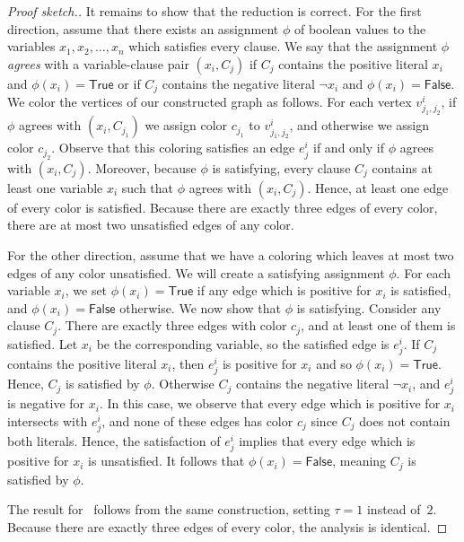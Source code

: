 \begin{proof}[Proof sketch.]
    It remains to show that the reduction is correct.
    For the first direction, assume that there exists an assignment $\phi$ of boolean values to the variables $x_1, x_2, \ldots, x_n$ which satisfies every clause. We say that the assignment $\phi$ \emph{agrees} with a variable-clause pair $(x_i, C_j)$ if $C_j$ contains the positive literal $x_i$ and $\phi(x_i) = \textsf{True}$ or if $C_j$ contains the negative literal $\neg x_i$ and $\phi(x_i) = \textsf{False}$.
    We color the vertices of our constructed graph as follows.
    For each vertex $v_{j_1, j_2}^i$, if $\phi$ agrees with $(x_i, C_{j_1})$ we assign color $c_{j_1}$ to $v_{j_1, j_2}^i$, and otherwise we assign color $c_{j_2}$.
    Observe that this coloring satisfies an edge $e_j^i$ if and only if $\phi$ agrees with $(x_i, C_j)$.
    Moreover, because $\phi$ is satisfying,
    every clause $C_j$ contains at least one variable $x_i$ such that $\phi$ agrees with $(x_i, C_j)$.
    Hence, at least one edge of every color is satisfied. Because there are exactly three edges of every color, there are at most two unsatisfied edges of any color.

    For the other direction, assume that we have a coloring which leaves at most two edges of any color unsatisfied. We will create a satisfying assignment $\phi$.
    For each variable $x_i$, we set $\phi(x_i) = \textsf{True}$ if any edge which is positive for $x_i$ is satisfied, and $\phi(x_i) = \textsf{False}$ otherwise.
    We now show that $\phi$ is satisfying. Consider any clause $C_j$. There are exactly three edges with color $c_j$, and at least one of them is satisfied.
    Let $x_i$ be the corresponding variable, so the satisfied edge is $e_j^i$.
    If $C_j$ contains the positive literal $x_i$, then $e_j^i$ is positive for $x_i$ and so $\phi(x_i) = \textsf{True}$. Hence, $C_j$ is satisfied by $\phi$.
    Otherwise $C_j$ contains the negative literal $\neg x_i$, and $e_j^i$ is negative for $x_i$.
    In this case, we observe that every edge which is positive for $x_i$ intersects with $e_j^i$, and none of these edges has color $c_j$ since
    $C_j$ does not contain both literals. Hence, the satisfaction of $e_j^i$ implies that every edge which is positive for $x_i$ is unsatisfied.
    It follows that $\phi(x_i) = \textsf{False}$, meaning $C_j$ is satisfied by $\phi$.

    The result for~\cfmaxECC{} follows from the same construction, setting $\tau = 1$ instead of~$2$. Because there are exactly three edges of every color, the analysis is identical.
\end{proof}
